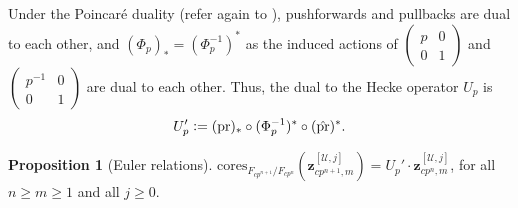 \documentclass[a4paper]{amsart}
\numberwithin{equation}{section}
\theoremstyle{definition}
\newtheorem{proposition}[theorem]{Proposition}
\newcommand{\defeq}{\vcentcolon=}
\newcommand{\cores}{\mathrm{cores}}
\begin{document}
Under the Poincaré duality (refer again to \cite[Corollary 11.2]{Milne.EC}), pushforwards and pullbacks are dual to each other, and $(\Phi_p)_*=(\Phi_{p}^{-1})^*$ as the induced actions of $\left(\begin{smallmatrix}p & 0 \\ 0 & 1\end{smallmatrix}\right)$ and $\left(\begin{smallmatrix}p^{-1} & 0 \\ 0 & 1\end{smallmatrix}\right)$ are dual to each other. Thus, the dual to the Hecke operator $U_p$ is \[U_p'\defeq ({\mathrm{pr}})_*\circ(\Phi_p^{-1})^*\circ(\hat{\mathrm{pr}})^*.\]

\begin{proposition}[Euler relations]\label{prop.EulerRelations}
$\cores_{F_{cp^{n+1}}/F_{cp^n}}(\mathbf{z}_{cp^{n+1},m}^{[\mathscr{U},j]})=U_p'\cdot\mathbf{z}_{cp^{n},m}^{[\mathscr{U},j]}$, for all $n\geq m\geq 1$ 
and all $j\geq 0$. 
\end{proposition}
\end{document}

